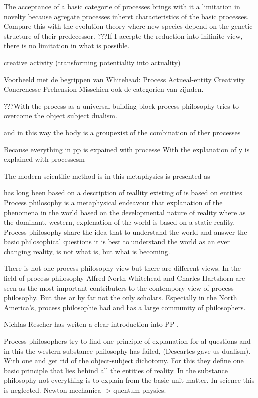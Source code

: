 The acceptance of a basic categorie of processes brings with it a limitation in novelty because agregate processes inheret characteristics of the basic processes. Compare this with the evolution theory where new species depend on the genetic structure of their predecessor.
???If I accepte the reduction into inifinite view, there is no limitation in what is possible.

creative activity (transforming potentiality into actuality)

Voorbeeld met de begrippen van Whitehead:
Process
Actueal-entity
Creativity
Concrenesse
Prehension
Misschien ook de categorien van zijnden.


???With the process as a universal building block process philosophy tries to overcome the object subject dualism.

and in this way the body is a groupexist of the combination of ther processes

Because everything in pp is expained with processe
With the explanation of y is explained with processesm




The modern scientific method is 
in this metaphysics is presented as 


has long been based on a description of reallity existing of 
is based on entities
Process philosophy is a metaphysical endeavour that  explanation of the phenomena in the world based on the developmental nature of reality where as the dominant, western, explenation of the world is based on a static reality. 
Process philosophy share the idea that to understand the world and answer the basic philosophical questions it is best to understand the world as an ever changing reality, is not what is, but what is becoming.

There is not one process philosophy view but there are different views.
In the field of process philosophy Alfred North Whitehead and Charles Hartshorn are seen as the most important contributers to the contempory view of process philosophy. 
But thes ar by far not the only scholars. Especially in the North America's, process philosophie had and has a large community of philosophers. 

Nichlas Rescher has writen a clear introduction into PP \cite{rescher1996process}.

Process philosophers try to find one principle of explanation for al questions and in this the western  substance philosophy has failed, (Descartes gave us dualism).
With one and get rid of the object-subject dichotomy. For this they define one basic principle that lies behind all the entities of reality. 
In the substance philosophy not everything is to explain from the basic unit matter. In science this is neglected.
Newton mechanica -> quentum physics.

